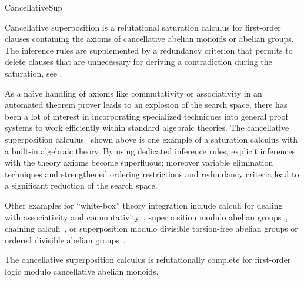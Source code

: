 \begin{entry}{CancellativeSup}
\begin{clarifications}
Cancellative superposition is a refutational saturation calculus for
first-order clauses containing the axioms of
cancellative abelian monoids or abelian groups.
The inference rules are supplemented by a redundancy criterion
that permits to delete clauses that are unnecessary for
deriving a contradiction during the saturation, see .
\end{clarifications}

\begin{history}
As a na{\"\i}ve handling of axioms like commutativity or associativity
in an automated theorem prover
leads to an explosion of the search space,
there has been a lot of interest in
incorporating specialized techniques into general proof systems
to work efficiently within standard algebraic theories.
The cancellative superposition calculus~\cite{GanzingerWaldmann1996CADE}
shown above
is one example of a saturation calculus with a built-in algebraic theory.
By using dedicated inference rules,
explicit inferences with the theory axioms become superfluous;
moreover variable elimination techniques
and strengthened ordering restrictions and redundancy criteria
lead to a significant reduction of the search space.

Other examples for ``white-box'' theory integration include
calculi for dealing with associativity and
commutativity~\cite{Plotkin1972,Slagle1974JACM,PetersonStickel1981,RusinowitchVigneron1995,Paul1992,BachmairGanzinger1994CTRS},
superposition modulo abelian groups~\cite{GodoyNieuwenhuis2004},
chaining calculi~\cite{Slagle1972JACM,Hines1992JAR,BachmairGanzinger1994LICS,BachmairGanzinger1994CADE},
or superposition modulo
divisible torsion-free abelian groups
or ordered divisible abelian groups~\cite{Waldmann2002aJSC,Waldmann2002bJSC,Waldmann2001IJCAR}.

\end{history}

\begin{technicalities}
The cancellative superposition calculus is refutationally complete for
first-order logic modulo cancellative abelian monoids.
\end{technicalities}




\end{entry}
